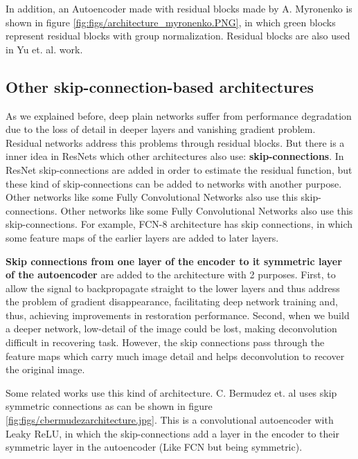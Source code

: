 In addition, an Autoencoder made with residual blocks made by A. Myronenko \cite{myronenko20183d} is shown in figure \ref{fig:figs/architecture_myronenko.PNG}, in which green blocks represent residual blocks with group normalization. Residual blocks are also used in Yu et. al. \cite{learnvolrepreCODE} work. 




\subsection{Other skip-connection-based architectures}

As we explained before, deep plain networks suffer from performance degradation due to the loss of detail in deeper layers and vanishing gradient problem. Residual networks address this problems through residual blocks. But there is a inner idea in ResNets which other architectures also use: \textbf{skip-connections}. In ResNet skip-connections are added in order to estimate the residual function, but these kind of skip-connections can be added to networks with another purpose. Other networks like some Fully Convolutional Networks also use this skip-connections. Other networks like some Fully Convolutional Networks also use this skip-connections. For example, FCN-8 architecture has skip connections, in which some feature maps of the earlier layers are added to later layers.

\textbf{Skip connections from one layer of the encoder to it symmetric layer of the autoencoder} are added to the architecture with 2 purposes. First, to allow the signal to backpropagate straight to the lower layers and thus address the problem of gradient disappearance, facilitating deep network training and, thus, achieving improvements in restoration performance. Second, when we build a deeper network, low-detail of the image could be lost, making deconvolution difficult in recovering task. However, the skip connections pass through the feature maps which carry much image detail and helps deconvolution to recover the original image. 

Some related works use this kind of architecture. C. Bermudez et. al \cite{bermudez2018t1autoencoder} uses skip symmetric connections as can be shown in figure \ref{fig:figs/cbermudezarchitecture.jpg}. This is a convolutional autoencoder with Leaky ReLU, in which the skip-connections add a layer in the encoder to their symmetric layer in the autoencoder (Like FCN but being symmetric).

